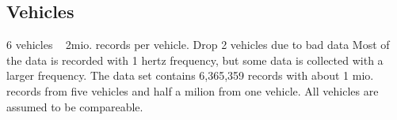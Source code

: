\subsection{Vehicles}
6 vehicles ~ 2mio. records per vehicle.
Drop 2 vehicles due to bad data
Most of the data is recorded with 1 hertz frequency, but some data is collected with a larger frequency.
The data set contains 6,365,359 records with about 1 mio. records from five vehicles and half a milion from one vehicle.
All vehicles are assumed to be compareable.%

\begin{comment}
A number of data sources can be used to gather data.
GPS data can easily be collected from any vehicle equiped with a GPS system, through which for example a timestamp, longitude, latitude and speed are available.
CANBus data provides information about the state of the vehicle.  %
Retriving CANBus data is not as easy as GPS data, and little data is therefore available. 
CANBus data is for example the engines rounds per minute, fuel consumption and temperature. 
The hauliers may also provide additional information such as vehicle model, capacity and weight. 

Table~\ref{tb:dataDescription} lists the data columns of the provided data set.
GPS and CANBus data is colleted for six vehicles over a timeperiod.
Most of the data is recorded with 1 hertz frequency, but some data is collected with a larger frequency.
The data set contains 6,365,359 records with about 1 mio. records from five vehicles and half a milion from one vehicle.
All vehicles are assumed to be compareable.%
Of the four columns for fuel comsumption, \var{totalconsumed} is the most accurate measure.
The instantaneous values, i.e. \var{actualconsumed} and \var{actual\_km\_l}, is said to be undependable by the data provider and should not be used. 
\var{fuellevel} is the fuel level in the tank in percentage (100 \% is full and 0 \% is empty) and \var{totalconsumed} is the amount of fuel consumed.
\var{totalconsumed} only has a granularity of half a liter, which means it can only be used at an agreegated level of at least a trip in order to get usable results.

Non of the data provided by the haulier is available.
\end{comment}